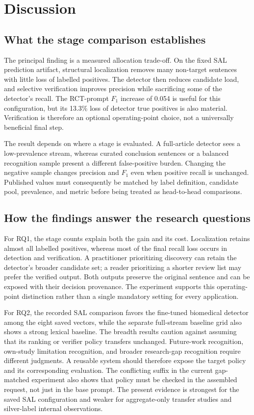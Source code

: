 \section{Discussion}
\label{S:discussion}

\subsection{What the stage comparison establishes}

The principal finding is a measured allocation trade-off. On the fixed SAL prediction artifact,
structural localization removes many non-target sentences with little loss of labelled positives.
The detector then reduces candidate load, and selective verification improves precision while
sacrificing some of the detector's recall. The RCT-prompt $F_1$ increase of 0.054 is useful for
this configuration, but its 13.3\% loss of detector true positives is also material. Verification
is therefore an optional operating-point choice, not a universally beneficial final step.

The result depends on where a stage is evaluated. A full-article detector sees a low-prevalence
stream, whereas curated conclusion sentences or a balanced recognition sample present a different
false-positive burden. Changing the negative sample changes precision and $F_1$ even when positive
recall is unchanged. Published values must consequently be matched by label definition, candidate
pool, prevalence, and metric before being treated as head-to-head comparisons.

\subsection{How the findings answer the research questions}

For RQ1, the stage counts explain both the gain and its cost. Localization retains almost all
labelled positives, whereas most of the final recall loss occurs in detection and verification.
A practitioner prioritizing discovery can retain the detector's broader candidate set; a reader
prioritizing a shorter review list may prefer the verified output. Both outputs preserve the
original sentence and can be exposed with their decision provenance. The experiment supports
this operating-point distinction rather than a single mandatory setting for every application.

For RQ2, the recorded SAL comparison favors the fine-tuned biomedical detector among the eight
saved vectors, while the separate full-stream baseline grid also shows a strong lexical baseline.
The breadth results caution against assuming that its ranking or verifier policy transfers unchanged.
Future-work recognition, own-study limitation recognition, and broader research-gap recognition
require different judgments. A reusable system should therefore expose the target policy and
its corresponding evaluation. The conflicting suffix in the current gap-matched experiment
also shows that policy must be checked in the assembled request, not just in the base prompt.
The present evidence is strongest for the saved SAL configuration and weaker for aggregate-only
transfer studies and silver-label internal observations.

